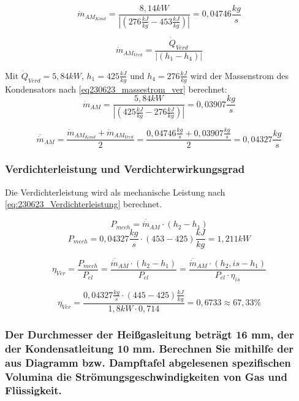 $$ \dot m_{AM_{Kond}} = \frac{8,14kW}{|(276\frac{kJ}{kg} - 453\frac{kJ}{kg})|} = 0,04746 \frac{kg}{s} $$

\begin{equation}
  \dot m_{AM_{Verd}} = \frac{\dot Q_{Verd}}{|(h_1-h_4)|}
    \label{eq230623_massestrom_ver}
\end{equation}

Mit $\dot Q_{Verd}=5,84kW$, $h_1=425\frac{kJ}{kg}$ und $h_4=276\frac{kJ}{kg}$ wird der Massenstrom des Kondensators nach \autoref*{eq230623_massestrom_ver} berechnet:
$$\dot m_{AM} = \frac{5,84 kW}{|(425\frac{kJ}{kg}-276\frac{kJ}{kg})|} = 0,03907 \frac{kg}{s}$$

$$\overline{\dot m}_{AM} = \frac{\dot m_{AM_{Kond}}+\dot m_{AM_{Verd}}}{2} = \frac{0,04746 \frac{kg}{s}+0,03907 \frac{kg}{s}}{2} = 0,04327 \frac{kg}{s} $$



\subsubsection{Verdichterleistung und Verdichterwirkungsgrad}

Die Verdichterleistung wird als mechanische Leistung nach \autoref{eq:230623_Verdichterleistung} berechnet.

\begin{equation}
    P_{mech} = \overline{\dot m}_{AM} \cdot (h_2-h_1)
\label{eq:230623_Verdichterleistung}
\end{equation}
$$  P_{mech} = 0,04327 \frac{kg}{s} \cdot (453-425)\frac{kJ}{kg} = 1,211 kW $$

\begin{equation}
  \eta_{Ver} = \frac{P_{mech}}{P_{el}}=\frac{\overline{\dot m}_{AM}\cdot (h_2-h_1)}{P_{el}}=\frac{\overline{\dot m}_{AM}\cdot (h_2,is-h_1)}{P_{el}\cdot \eta_{is}}
\label{eq:230623_Verdichterwirkungsgrad}
\end{equation}

$$\eta_{Ver} = \frac{0,04327 \frac{kg}{s}\cdot (445-425)\frac{kJ}{kg}}{1,8 kW \cdot 0,714}= 0,6733 \approx 67,33 \% $$

\subsubsection{Der Durchmesser der Heißgasleitung beträgt 16 mm, der der Kondensatleitung 10
mm. Berechnen Sie mithilfe der aus Diagramm bzw. Dampftafel abgelesenen spezifischen Volumina die Strömungsgeschwindigkeiten von Gas und Flüssigkeit.}

